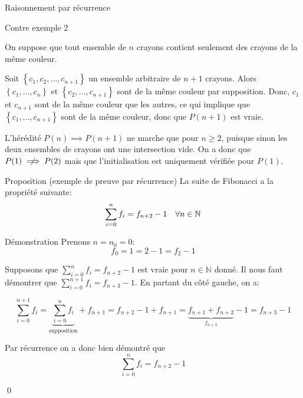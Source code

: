 \documentclass[a4paper]{article}
\begin{document}
\begin{parag}{Raisonnement par récurrence}
\begin{subparag}{Contre exemple 2}
        \vspace{1em}

         On suppose que tout ensemble de $n$ crayons contient seulement des crayons de la même couleur. 

        Soit $\left\{c_1, c_2, \ldots, c_{n+1}\right\}$ un ensemble arbitraire de $n+1$ crayons. Alors $\left\{c_1, \ldots, c_n\right\}$ et $\left\{c_2, \ldots, c_{n+1}\right\}$ sont de la même couleur par supposition. Donc, $c_1$ et $c_{n+1}$ sont de la même couleur que les autres, ce qui implique que $\left\{c_1, \ldots, c_{n+1}\right\}$ sont de la même couleur, donc que $P\left(n+1\right)$ est vraie.
       
        \vspace{1em}
         L'hérédité $P\left(n\right) \implies P\left(n+1\right)$ ne marche que pour $n \geq 2$, puisque sinon les deux ensembles de crayons ont une intersection vide. On a donc que $P\left(1\right) \centernot\implies P\left(2\right)$ mais que l'initialisation est uniquement vérifiée pour $P\left(1\right)$.
    \end{subparag}
\end{parag}

\begin{parag}{Proposition (exemple de preuve par récurrence)}
    La suite de Fibonacci a la propriété suivante:
    \[\sum_{i=0}^{n} f_i = f_{n+2} - 1\quad\forall n \in \mathbb{N}\]

    \begin{subparag}{Démonstration}
         Prenons $n = n_0 = 0$: 
        \[f_0 = 1 = 2 - 1 = f_2 - 1\]
        
        \vspace{1em}
         Supposons que $\sum_{i=0}^{n} f_i = f_{n + 2} - 1$ est vraie pour $n \in \mathbb{N}$ donné. Il nous faut démontrer que $\sum_{i=0}^{n+1} f_i = f_{n+3} - 1$. En partant du côté gauche, on a:

        \[\sum_{i=0}^{n+1} f_i = \underbrace{\sum_{i=0}^{n} f_i}_{\text{supposition}} + f_{n+1} = f_{n+2} - 1 + f_{n+1} = \underbrace{f_{n+1} + f_{n+2} }_{f_{n+3}} - 1 = f_{n+3} - 1\]

        \vspace{1em}
         Par récurrence on a donc bien démontré que 
        \[\sum_{i=0}^{n} f_i = f_{n+2} - 1\]

        \qed
    \end{subparag}
\end{parag}
\end{document}
